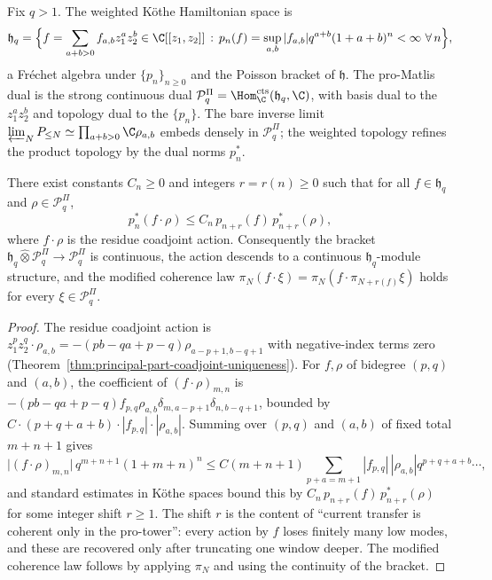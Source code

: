 \begin{defn}
\label{def:completion-weighted-kothe}
Fix \(q>1\).  The weighted K\"othe Hamiltonian space is
\[
  \mathfrak h_q
  =\Bigl\{f=\sum_{a+b>0}f_{a,b}z_1^az_2^b\in\C[[z_1,z_2]]\,:\,
   p_n(f)=\sup_{a,b}|f_{a,b}|q^{a+b}(1+a+b)^n<\infty
   \,\,\forall\,n\Bigr\},
\]
a Fr\'echet algebra under
\(\{p_n\}_{n\ge 0}\) and the Poisson bracket of \(\mathfrak h\).
The pro-Matlis dual is the strong continuous dual
\(\mathcal P^\Pi_q=\Hom^{\mathrm{cts}}_\C(\mathfrak h_q,\C)\), with
basis dual to the \(z_1^az_2^b\) and topology dual to the
\(\{p_n\}\).  The bare inverse limit
\(\varprojlim_NP_{\le N}\simeq\prod_{a+b>0}\C\rho_{a,b}\) embeds
densely in \(\mathcal P^\Pi_q\); the weighted topology refines the
product topology by the dual norms \(p_n^*\).
\end{defn}

\begin{prop}
\label{prop:completion-promatlis-continuity}
There exist constants \(C_n\ge 0\) and integers
\(r=r(n)\ge 0\) such that for all \(f\in\mathfrak h_q\) and
\(\rho\in\mathcal P^\Pi_q\),
\[
  p^*_n(f\cdot\rho)\le C_n\,p_{n+r}(f)\,p^*_{n+r}(\rho),
\]
where \(f\cdot\rho\) is the residue coadjoint action.  Consequently
the bracket
\(\mathfrak h_q\widehat\otimes\mathcal P^\Pi_q\to\mathcal P^\Pi_q\)
is continuous, the action descends to a continuous
\(\mathfrak h_q\)-module structure, and the modified coherence law
\(\pi_N(f\cdot\xi)=\pi_N(f\cdot\pi_{N+r(f)}\xi)\) holds for
every \(\xi\in\mathcal P^\Pi_q\).
\end{prop}

\begin{proof}
The residue coadjoint action is
\(z_1^pz_2^q\cdot\rho_{a,b}=-(pb-qa+p-q)\rho_{a-p+1,b-q+1}\) with
negative-index terms zero
(Theorem~\ref{thm:principal-part-coadjoint-uniqueness}).  For \(f,\rho\) of
bidegree \((p,q)\) and \((a,b)\), the coefficient of
\((f\cdot\rho)_{m,n}\) is
\(-(pb-qa+p-q)f_{p,q}\rho_{a,b}\delta_{m,a-p+1}\delta_{n,b-q+1}\),
bounded by \(C\cdot(p+q+a+b)\cdot|f_{p,q}|\cdot|\rho_{a,b}|\).
Summing over \((p,q)\) and \((a,b)\) of fixed total \(m+n+1\) gives
\[
  \bigl|(f\cdot\rho)_{m,n}\bigr|\,q^{m+n+1}(1+m+n)^n
  \le C(m+n+1)\sum_{p+a=m+1}|f_{p,q}|\,|\rho_{a,b}|q^{p+q+a+b}\cdots,
\]
and standard estimates in K\"othe spaces
\cite{kothe-topological-vector-spaces} bound this by
\(C_n\,p_{n+r}(f)\,p^*_{n+r}(\rho)\) for some integer shift
\(r\ge 1\).  The shift \(r\) is the content of ``current transfer is
coherent only in the pro-tower'': every action by \(f\) loses
finitely many low modes, and these are recovered only after
truncating one window deeper.  The modified coherence law follows
by applying \(\pi_N\) and using the continuity of the bracket.
\end{proof}

